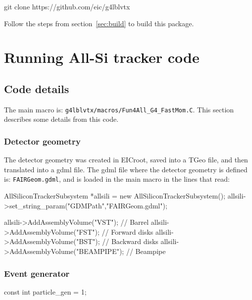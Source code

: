\documentclass[12pt]{article}
\begin{document}
\begin{tcolorbox}
\begin{verbnobox}[\scriptsize]
git clone https://github.com/eic/g4lblvtx
\end{verbnobox}  
\end{tcolorbox}

Follow the steps from section~\ref{sec:build} to build this package.

\newpage
\section{Running All-Si tracker code}

\subsection{Code details}

The main macro is: \verb|g4lblvtx/macros/Fun4All_G4_FastMom.C|.
This section describes some details from this code.

\subsubsection{Detector geometry}

The detector geometry was created in EICroot, saved into a TGeo file, and then translated into a gdml file. The gdml
file where the detector geometry is defined is: \verb|FAIRGeom.gdml|, and is loaded in the main macro in the lines that read:

\begin{tcolorbox}
\begin{verbnobox}[\scriptsize]
AllSiliconTrackerSubsystem *allsili = new AllSiliconTrackerSubsystem();
allsili->set_string_param("GDMPath","FAIRGeom.gdml");

allsili->AddAssemblyVolume("VST");      // Barrel
allsili->AddAssemblyVolume("FST");      // Forward disks
allsili->AddAssemblyVolume("BST");      // Backward disks
allsili->AddAssemblyVolume("BEAMPIPE"); // Beampipe
\end{verbnobox}
\end{tcolorbox}
	
\subsubsection{Event generator}

\begin{tcolorbox}
\begin{verbnobox}[\scriptsize]
const int particle_gen = 1;
\end{verbnobox}
\end{tcolorbox}
\end{document}
